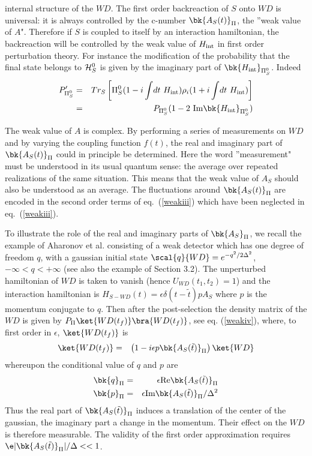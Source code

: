 \documentclass[12pt]{article}
\begin{document}
internal structure of the $WD$. The first order backreaction of $S$
onto $WD$ is
universal: it is always controlled by the c-number $\bk{A_{S}(t)}_{\Pi}$,
the ''weak
value of $A$". Therefore
if $S$ is coupled to itself by an
interaction hamiltonian, the backreaction
will be controlled by the
weak value of $H_{\rm int}$
in first order perturbation theory.
For instance the modification of the probability that the
final state belongs to ${\cal H}_S^{0}$ is
given by the imaginary part
of $\bk{H_{\rm int}}_{\Pi_S^{0}}$.
Indeed
\begin{eqnarray}
P_{\Pi_S^0}^\prime &=& Tr_S \left[
\Pi_S^0 ( 1 - i \int\! dt\  H_{\rm int} )
\rho_i ( 1 + i \int\! dt\  H_{\rm int} )\right]\nonumber\\
&=&P_{\Pi_S^0} (1 - 2 { \mbox{ Im} \bk{H_{\rm int}}_{\Pi_S^{0}}})
\end{eqnarray}


The weak value of $A$ is complex. By  performing a
series of
measurements on $WD$
and by varying the coupling function $f(t)$, the real and imaginary part of
$\bk{A_{S}(t)}_{\Pi}$
 could in principle be determined. Here the word ''measurement"
must be understood in its usual quantum sense: the average over repeated
realizations of the same situation. This means that the weak value of $A_S$
should also be understood as an average. The fluctuations around
$\bk{A_{S}(t)}_{\Pi}$
are encoded in the second order terms of eq.~(\ref{weakiii}) which have been
neglected in eq.~(\ref{weakiii}).

To illustrate the role of the real and imaginary parts of $\bk{A_{S}}_{\Pi}$,
we
recall the example of Aharonov et al. consisting of a  weak
detector which has one degree of freedom $q$,
 with a gaussian initial state
$\scal{q}
{WD}=e^{-q^2/
2\Delta^2}$,$-\infty < q < + \infty$ (see also the example of Section 3.2).
 The unperturbed hamiltonian of $WD$ is taken to vanish
(hence $U_{WD}(t_1,t_2) = 1$)
 and the interaction hamiltonian is  $H_{S-WD} (t) =\epsilon
\delta(t-\tilde t) p A_S$ where $p$ is the momentum conjugate to $q$. Then
after the post-selection the density matrix
of the $WD$ is given by $P_{\Pi} \ket{WD(t_f)}\bra{WD(t_f)}$,
see eq. (\ref{weakiv}),
  where, to
first order in $\epsilon$, $\ket{WD(t_f)}$ is
\begin{eqnarray}
\ket{WD(t_f)} &=&\left(1-i\epsilon p\bk{A_{S}(\tilde t)}_{\Pi} \right)
\ket{WD}
 \end{eqnarray}
whereupon the conditional value of $q$ and $p$ are
\begin{eqnarray}
\bk{q}_{\Pi}&=& \epsilon \mbox{Re} \bk{A_{S}(\tilde t)}_{\Pi}\nonumber\\
\bk{p}_{\Pi}&=& \epsilon \mbox{Im} \bk{A_{S}(\tilde t)}_{\Pi}/\Delta^2
 \label{weakviii}
 \end{eqnarray}
 Thus the real part of $\bk{A_{S}(\tilde t)}_{\Pi} $ induces a
translation of the center of the gaussian, the imaginary part
a change in the
momentum. Their effect on the $WD$ is therefore measurable.
The validity of the first order approximation requires
$\e |\bk{A_{S}(\tilde t)}_{\Pi} | / \Delta <<1$.
\end{document}
